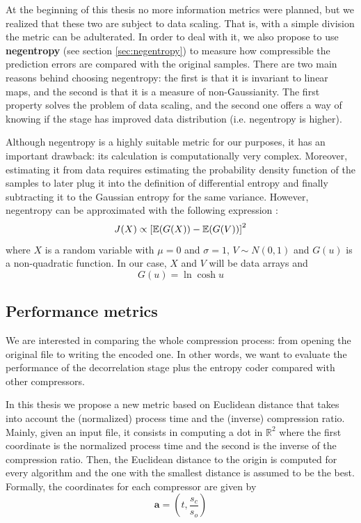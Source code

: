 At the beginning of this thesis no more information metrics were planned, but we realized that these two are subject to data scaling. That is, with a simple division the metric can be adulterated. In order to deal with it, we also propose to use \textbf{negentropy} (see section \ref{sec:negentropy}) to measure how compressible the prediction errors are compared with the original samples. There are two main reasons behind choosing negentropy: the first is that it is invariant to linear maps, and the second is that it is a measure of non-Gaussianity. The first property solves the problem of data scaling, and the second one offers a way of knowing if the stage has improved data distribution (i.e. negentropy is higher).

Although negentropy is a highly suitable metric for our purposes, it has an important drawback: its calculation is computationally very complex. Moreover, estimating it from data requires estimating the probability density function of the samples to later plug it into the definition of differential entropy and finally subtracting it to the Gaussian entropy for the same variance. However, negentropy can be approximated with the following expression \parencite{HYVARINEN2000411}:
\begin{equation}
J(X) \propto \left[\operatorname{\mathbb{E}}(G(X)) - \operatorname{\mathbb{E}}(G(V))\right]^2
\end{equation}
where $X$ is a random variable with $\mu = 0$ and $\sigma = 1$, $V \sim N(0,1)$ and $G(u)$ is a non-quadratic function. In our case, $X$ and $V$ will be data arrays and
\begin{equation}
G(u) = \ln \cosh u
\end{equation}

\subsection{Performance metrics}
We are interested in comparing the whole compression process: from opening the original file to writing the encoded one. In other words, we want to evaluate the performance of the decorrelation stage plus the entropy coder compared with other compressors.

In this thesis we propose a new metric based on Euclidean distance that takes into account the (normalized) process time and the (inverse) compression ratio. Mainly, given an input file, it consists in computing a dot in $\mathbb{R}^2$ where the first coordinate is the normalized process time and the second is the inverse of the compression ratio. Then, the Euclidean distance to the origin is computed for every algorithm and the one with the smallest distance is assumed to be the best. Formally, the coordinates for each compressor are given by
\begin{equation} \label{eq:dot_comp}
\boldsymbol{a} = \left(t, \frac{s_c}{s_o}\right)
\end{equation}

